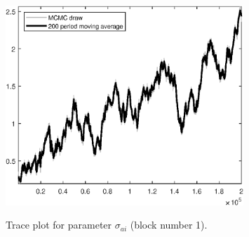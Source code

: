 \begin{figure}[H]
\centering
  \includegraphics[width=0.8\textwidth]{BRS_sectoral_rest/graphs/TracePlot_sigma_ai_blck_1}\\
    \caption{Trace plot for parameter ${\sigma_{ai}}$ (block number 1).}
\end{figure}
